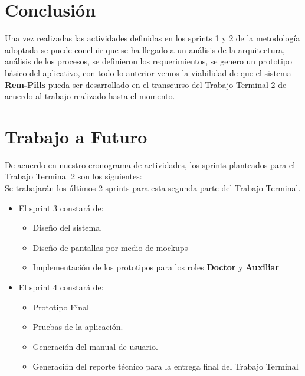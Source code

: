 \section{Conclusión}

Una vez realizadas las actividades definidas en los sprints 1 y 2 de la metodología adoptada se puede concluir que se ha llegado a un análisis de la arquitectura, análisis de los procesos, se definieron los requerimientos, se genero un prototipo básico del aplicativo, con todo lo anterior vemos la viabilidad de que el sistema \textbf{Rem-Pills} pueda ser desarrollado en el transcurso del Trabajo Terminal 2 de acuerdo al trabajo realizado hasta el momento.




\section{Trabajo a Futuro}
De acuerdo en nuestro cronograma de actividades, los sprints planteados para el Trabajo Terminal 2 son los siguientes:\\

Se trabajarán los últimos 2 sprints para esta segunda parte del Trabajo Terminal.
\begin{itemize}
	\item El sprint 3 constará de:
	\begin{itemize}
		\item Diseño del sistema.
		\item Diseño de pantallas por medio de mockups
		\item Implementación de los prototipos para los roles \textbf{Doctor} y \textbf{Auxiliar}
	\end{itemize}
	
	\item El sprint 4 constará de:
	\begin{itemize}
		\item Prototipo Final
		\item Pruebas de la aplicación.
		\item Generación del manual de usuario.
		\item Generación del reporte técnico para la entrega final del Trabajo Terminal
	\end{itemize}
\end{itemize}


